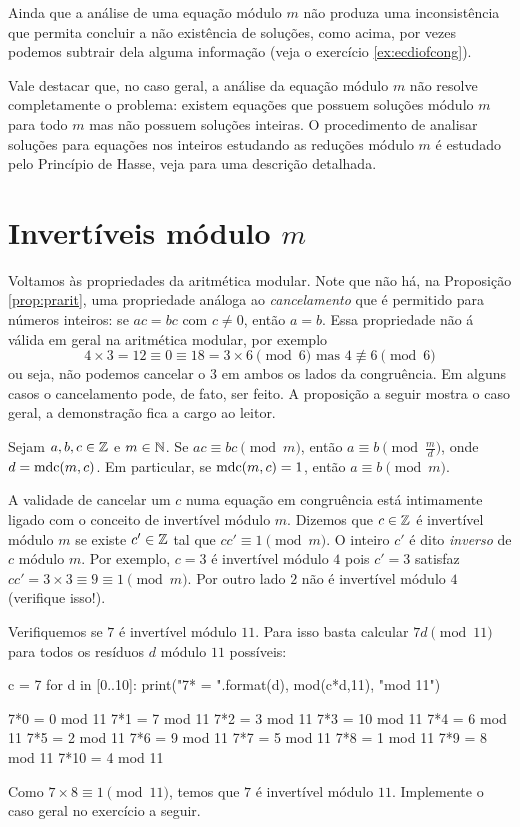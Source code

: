 Ainda que a análise de uma
equação módulo $m$ não produza uma inconsistência
que permita concluir a não existência de soluções, como acima,
por vezes podemos
subtrair dela alguma informação (veja o exercício \ref{ex:ecdiofcong}).

Vale destacar que, no caso geral, 
a análise da equação módulo $m$ não resolve completamente
o problema: 
existem equações que possuem soluções módulo $m$ para todo $m$
mas não possuem soluções inteiras. 
O procedimento de analisar soluções para equações nos inteiros
estudando as reduções módulo $m$ é estudado pelo Princípio
de Hasse, veja \cite{aitken2011counterexamples} para
uma descrição detalhada.

\section{Invertíveis módulo $m$}
\label{sec:invmodm}
Voltamos às propriedades da aritmética modular. Note que
não há, na Proposição \ref{prop:prarit}, uma propriedade análoga ao
\emph{cancelamento} que é permitido para
números inteiros: se $ac = bc$ com $c \neq 0$, então
$a = b$. Essa propriedade não á válida em geral na aritmética
modular, por exemplo
$$
  4\times 3  = 12 \equiv 0 \equiv 18 = 3\times 6 \pmod 6
\text{ mas } 4 \not\equiv 6 \pmod 6
$$
ou seja, não podemos
cancelar o $3$ em ambos os lados da congruência. Em alguns
casos o cancelamento pode, de fato, ser feito. A proposição
a seguir mostra o caso geral, a demonstração
fica a cargo ao leitor.

\begin{proposition}
  Sejam $a,b,c \in \mathbb{Z}$ e $m \in \mathbb{N}$. Se $ac \equiv bc
  \pmod m$, então $a \equiv b \pmod{\frac{m}{d}}$, onde
  $d = \operatorname{mdc}(m,c)$. Em particular, se $\operatorname{mdc}(m,c) = 1$,
  então $a \equiv b \pmod m$.
\end{proposition}

A validade de cancelar um $c$ numa equação em
congruência está intimamente ligado com o
conceito de invertível módulo $m$.  Dizemos que
$c \in \mathbb{Z}$ é invertível módulo $m$ se existe $c' \in \mathbb{Z}$
tal que $cc' \equiv 1 \pmod m$.  O inteiro
$c'$ é dito \emph{inverso} de $c$ módulo $m$.
Por exemplo,
$c = 3$ é invertível módulo $4$ pois $c' = 3$
satisfaz $cc' = 3\times 3 \equiv 9 \equiv 1 \pmod m$.
Por outro lado $2$ não é invertível módulo $4$ (verifique isso!).

Verifiquemos se $7$ é invertível módulo $11$. 
Para isso basta calcular $7d \pmod{11}$ para todos
os resíduos $d$ módulo $11$ possíveis:
\begin{sageinput}
c = 7
for d in [0..10]:
  print("7*{} = ".format(d), mod(c*d,11), "mod 11")
\end{sageinput}
\begin{sageoutput}
7*0 =  0 mod 11
7*1 =  7 mod 11
7*2 =  3 mod 11
7*3 =  10 mod 11
7*4 =  6 mod 11
7*5 =  2 mod 11
7*6 =  9 mod 11
7*7 =  5 mod 11
7*8 =  1 mod 11
7*9 =  8 mod 11
7*10 =  4 mod 11
\end{sageoutput}
Como $7\times 8 \equiv 1 \pmod{11}$, temos que $7$ é invertível
módulo $11$. Implemente o caso geral no exercício a seguir.

